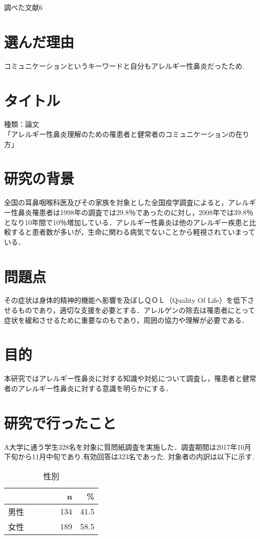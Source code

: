 \documentclass{jsarticle}
\begin{document}
\vspace{5em}
\fontsize{24pt}{40pt}\selectfont
\centerline{調べた文献6}
\vspace{1em}
\fontsize{10.5pt}{20pt}\selectfont
\section{選んだ理由}
コミュニケーションというキーワードと自分もアレルギー性鼻炎だったため.

\section{タイトル}
種類：論文
\\
「アレルギー性鼻炎理解のための罹患者と健常者のコミュニケーションの在り方」
\section{研究の背景}
全国の耳鼻咽喉科医及びその家族を対象とした全国疫学調査によると，アレルギー性鼻炎罹患者は1998年の調査では29.8％であったのに対し，2008年では39.8％となり10年間で10％増加している．アレルギー性鼻炎は他のアレルギー疾患と比較すると患者数が多いが，生命に関わる病気でないことから軽視されていまっている．
\section{問題点}
その症状は身体的精神的機能へ影響を及ぼしＱＯＬ（Quality Of Life）を低下させるものであり，適切な支援を必要とする．アレルゲンの除去は罹患者にとって症状を緩和させるために重要なのもであり，周囲の協力や理解が必要である．
\section{目的}
本研究ではアレルギー性鼻炎に対する知識や対処について調査し，罹患者と健常者のアレルギー性鼻炎に対する意識を明らかにする．
\section{研究で行ったこと}
A大学に通う学生328名を対象に質問紙調査を実施した．調査期間は2017年10月下旬から11月中旬であり,有効回答は323名であった.
対象者の内訳は以下に示す.
\\
\begin{table}[h]
\centering
\caption{性別}
\begin{tabular}{lrr}\hline
~~~~~~~ & n & \% \\ \hline\hline
男性~~~~~~~ & 134 & 41.5 \\ \hline
女性~~~~~~~ & 189 & 58.5 \\ \hline
\end{tabular}
\end{table}
\end{document}
